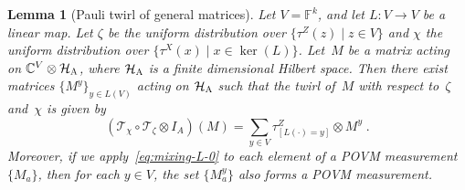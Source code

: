 \documentclass[11pt]{article}
\newtheorem{lemma}[theorem]{Lemma}
\theoremstyle{definition}
\newcommand{\Id}{\ensuremath{I}}
\newcommand{\C}{\ensuremath{\mathbb{C}}}
\newcommand{\F}{\ensuremath{\mathbb{F}}}
\newcommand{\mH}{\ensuremath{\mathcal{H}}}
\newcommand{\labelstyle}[1]{\ensuremath{\textsc{#1}}\xspace}
\newcommand{\alice}{\labelstyle{A}}
\begin{document}
\begin{lemma}[Pauli twirl of general matrices]
  \label{lem:mixing-L}
  Let $V= \F^k$, and let $L : V \rightarrow V$ be a linear map.
  Let $\zeta$ be the uniform distribution over $\{\tau^Z(z) \mid z \in V\}$ and
  $\chi$ the uniform distribution over $\{\tau^X(x) \mid x \in \ker(L)\}$.
  Let~$M$ be a matrix acting on $\C^V \otimes \mH_\alice$, where $\mH_\alice$ is
  a finite dimensional Hilbert space.
  Then there exist matrices $\{M^y\}_{y\in L(V)}$ acting on $\mH_\alice$ such
  that the twirl of~$M$ with respect to~$\zeta$ and~$\chi$ is given by
  \begin{equation}
    \label{eq:mixing-L-0}
    (\mathscr{T}_{\chi} \circ \mathscr{T}_{\zeta} \otimes \Id_A)(M) = \sum_{y\in
      V} \tau^Z_{[L(\cdot)= y]} \otimes M^y\;.
  \end{equation}
	Moreover, if we apply~\eqref{eq:mixing-L-0} to each element of a POVM
  measurement $\{M_a\}$, then for each $y \in V$, the set $\{M^y_a\}$ also forms
  a POVM measurement.
\end{lemma}
\end{document}
